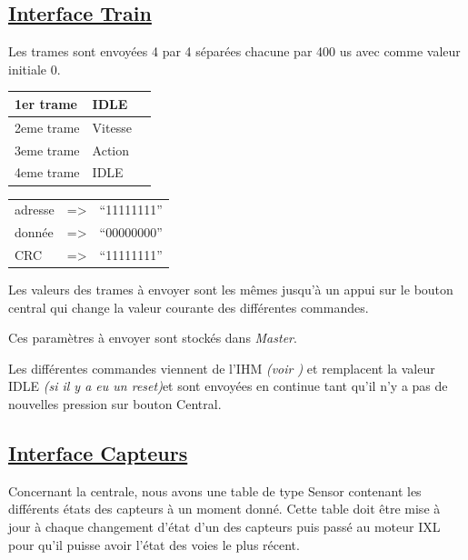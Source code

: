 \subsection{\underline{Interface Train}}
\label{sec:int_train}

\bigskip
Les trames sont envoyées 4 par 4 séparées chacune par 400 us avec comme valeur initiale 0.
\begin{center}
\begin{tabular}{|l|l|l|}
  \hline
  1er trame & IDLE \\
  \hline
  2eme trame & Vitesse \\
  \hline
  3eme trame & Action \\
  \hline
  4eme trame & IDLE \\
  \hline
\end{tabular}
\end{center}

\medskip
\begin{center}
\begin{tabular}{lll}
adresse & => & ``11111111'' \\
donnée  & => & ``00000000'' \\
CRC     & => & ``11111111'' \\
\end{tabular}
\end{center}

\medskip
Les valeurs des trames à envoyer sont les mêmes jusqu'à un appui sur
le bouton central qui change la valeur courante des différentes
commandes.

Ces paramètres à envoyer sont stockés dans \emph{Master}.

\medskip

Les différentes commandes viennent de l'IHM \emph{(voir
  \cite{rapport})}  et remplacent la valeur IDLE \emph{(si il y a eu
  un reset)}et sont envoyées en continue tant qu'il n'y a pas de nouvelles pression sur bouton Central.


\subsection{\underline{Interface Capteurs}}
\label{sec:int_cap}

Concernant la centrale, nous avons  une table de type Sensor
contenant les différents états des capteurs à un moment donné. Cette
table doit être mise à jour à chaque changement d'état d'un des
capteurs puis passé au moteur IXL pour qu'il puisse avoir l'état des
voies le plus récent. 

